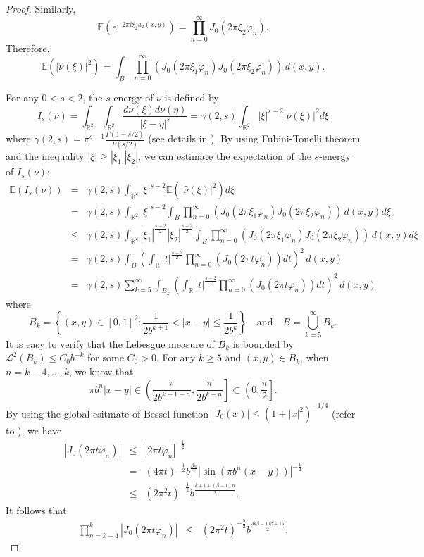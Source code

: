 \documentclass[12pt, reqno]{amsart}
\theoremstyle{plain}
\theoremstyle{definition}
\theoremstyle{remark}
\newcommand{\R}{\mathbb{R}}
\begin{document}
\begin{proof}
 	Similarly,
 	\[
 	\mathbb{E}\left(e^{-2\pi i \xi_2 a_2(x,y)}\right)
 	= \prod_{n=0}^\infty J_0\left(2\pi \xi_2 \varphi_n\right).
 	\]
 	Therefore,
 	\[
 	\mathbb{E}\left(|\hat{\nu}(\xi)|^2\right)
 	= \int_B \prod_{n=0}^\infty \left(J_0(2\pi \xi_1 \varphi_n) J_0(2\pi \xi_2 \varphi_n)\right)\, d(x,y).
 	\]
 	
 For any $0<s<2$, the $s$-energy of $\nu$  is defined by
 $$I_s(\nu)=\int_{\R^2}\int_{\R^2}\frac{d\nu(\xi)d\nu(\eta)}{|\xi-\eta|^s}= \gamma(2,s)\int_{\mathbb{R}^2} |\xi|^{s-2}|\hat{\nu}(\xi)|^2 d\xi$$ where $\gamma(2,s)=\pi^{s-1}\frac{\Gamma(1-s/2)}{\Gamma(s/2)}$ (see details in \cite{Mattila2015}).  By using Fubini-Tonelli theorem and  the inequality $|\xi| \ge |\xi_1|  |\xi_2|$, we can estimate the	expectation of the $s$-energy of $I_s(\nu)$:
 	 \begin{eqnarray}
 	\mathbb{E}(I_s(\nu))
 	&=& \gamma(2,s)\int_{\mathbb{R}^2} |\xi|^{s-2} \mathbb{E}\left(|\hat{\nu}(\xi)|^2\right) d\xi  \nonumber \\
 	&=& \gamma(2,s)\int_{\mathbb{R}^2} |\xi|^{s-2} \int_B \prod_{n=0}^\infty \left(J_0(2\pi \xi_1 \varphi_n) J_0(2\pi \xi_2 \varphi_n)\right) \, d(x,y) d\xi   \nonumber\\
 	&\le& \gamma(2,s)\int_{\mathbb{R}^2} |\xi_1|^{\frac{s-2}{2}} |\xi_2|^{\frac{s-2}{2}} \int_B \prod_{n=0}^\infty \left(J_0(2\pi \xi_1 \varphi_n) J_0(2\pi \xi_2 \varphi_n)\right) \, d(x,y) d\xi    \nonumber  \\
 	&=& \gamma(2,s)\int_B \left(\int_{\mathbb{R}} |t|^{\frac{s-2}{2}} \prod_{n=0}^\infty (J_0(2\pi t \varphi_n))dt\right)^2 \, d(x,y)   \nonumber  \\
 	&=& \gamma(2,s)\sum_{k=5}^{\infty}\int_{B_k} \left(\int_{\mathbb{R}} |t|^{\frac{s-2}{2}} \prod_{n=0}^\infty (J_0(2\pi t \varphi_n))dt\right)^2 \, d(x,y)  \label{eq-expectation}
  \end{eqnarray}
  where $$B_k=\left\{(x,y)\in [0,1]^2: \frac{1}{2b^{k+1}}<|x-y|\le \frac{1}{2b^k}\right\} \quad \text{and}\quad B=\bigcup_{k=5}^\infty B_k.$$    
  It is easy to verify that the Lebesgue measure of $B_k$ is bounded by $\mathcal{L}^2(B_k)\le C_0 b^{-k}$ for some $C_0>0$.    For any $k\ge 5$ and $(x,y)\in B_k$, when $n=k-4,\dots, k$,  we know that
   $$\pi b^n|x-y|\in \left(\frac{\pi}{2b^{k+1-n}},\frac{\pi}{2b^{k-n}}\right]\subset \left(0,\frac{\pi}{2}\right].$$  
   By using the global esitmate of Bessel function  $|J_0(x)|\le (1+|x|^2)^{-1/4}$ (refer to \cite {Mattila2015}), we have 
  \begin{eqnarray*} 
  |J_0(2\pi t \varphi_n)| &\le& |2\pi t \varphi_n|^{-\frac12} \\
  &=& (4\pi t)^{-\frac12}b^{\frac{\beta n}{2}}|\sin(\pi b^n(x-y))|^{-\frac12} \\
  &\le& (2\pi^2t)^{-\frac12}b^{\frac{k+1+(\beta-1)n}{2}}.
  \end{eqnarray*}
  It follows that 
  \begin{eqnarray*} 
  	\prod_{n=k-4}^k |J_0(2\pi t \varphi_n)| &\le& (2\pi^2t)^{-\frac52}b^{\frac{4k\beta-10\beta+15}{2}}.
   \end{eqnarray*}
 	

\end{proof}
\end{document}
